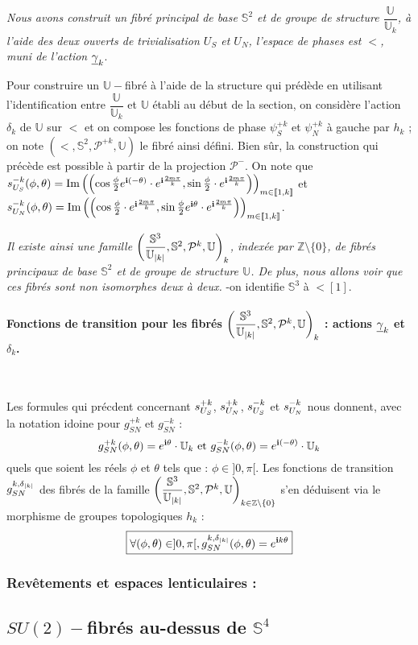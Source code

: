 \etoile
\emph{Nous avons construit un fibr\'e principal de base $\mathbb{S}^2$ et de groupe de structure $\dfrac{\mathbb{U}}{\mathbb{U}_k}$, %
\`a l'aide des deux ouverts de trivialisation $U_S$ et $U_N$, l'espace de phases est $\lt$, muni de l'action $\gk$}.
\par
Pour construire un $\mathbb{U}-$fibr\'e \`a l'aide de la structure qui pr\'ed\`ede en utilisant l'identification entre $\dfrac{\mathbb{U}}{\mathbb{U}_k}$ et $\mathbb{U}$ \'etabli au d\'ebut de la section, %
on consid\`ere l'action $\delta_k$ de $\mathbb{U}$ sur $\lt$ et on compose les fonctions de phase $\psi_S^{+k}$ et $\psi_N^{+k}$ \`a gauche par $h_k$ ; %
on note $\left(\lt ,\mathbb{S}^2,\mathcal{P}^{+k},\mathbb{U}\right)$ le fibr\'e ainsi d\'efini.
\ligneinter
Bien s\^ur, la construction qui pr\'ec\`ede est possible \`a partir de la projection $\mathcal{P}^-$. %
On note que $\se{S}{-k}(\phi,\theta)=\pla{\cos\frac{\phi}{2}\ec{(-\theta)}}{\sin\frac{\phi}{2}}$ et $\se{N}{-k}(\phi,\theta)=\pla{\cos\frac{\phi}{2}}{\sin\frac{\phi}{2}\ec{\theta}}$.
\par
\emph{Il existe ainsi une famille $\left(\lt[\abs{k}],\mathbb{S}^2,\mathcal{P}^k,\mathbb{U}\right)_k$, index\'ee par $\mathbb{Z}\setminus\{0\}$, de fibr\'es principaux de base $\mathbb{S}^2$ et de groupe de structure $\mathbb{U}$. %
De plus, nous allons voir que ces fibr\'es sont \emph{non isomorphes} deux \`a deux.} -on identifie $\mathbb{S}^3$ \`a $\lt[1]$.

\paragraph{Fonctions de transition pour les fibr\'es $\left(\lt[\abs{k}],\mathbb{S}^2,\mathcal{P}^k,\mathbb{U}\right)_k$ : actions $\gk$ et $\delta_k$.}~\\
\par
Les formules qui pr\'ecdent concernant $\se{S}{+k}$, $\se{N}{+k}$, $\se{S}{-k}$ et $\se{N}{-k}$ nous donnent, avec la notation idoine pour $g_{SN}^{+k}$ et $g_{SN}^{-k}$ :
\[g_{SN}^{+k}(\phi ,\theta)=\ec{\theta}\cdot\mathbb{U}_k\text{ et }g_{SN}^{-k}(\phi ,\theta)=\ec{(-\theta)}\cdot\mathbb{U}_k\]
quels que soient les r\'eels $\phi$ et $\theta$ tels que : $\phi\in ]0,\pi[$.
\ligneinter
Les fonctions de transition $g_{SN}^{k,\delta_{\abs{k}}}$ des fibr\'es de la famille $\left(\lt[\abs{k}],\mathbb{S}^2,\mathcal{P}^k,\mathbb{U}\right)_{k\in\mathbb{Z}\setminus\{0\}}$ %
s'en d\'eduisent via le morphisme de groupes topologiques $h_k$ :
\[\boxed{\forall (\phi,\theta)\in ]0,\pi [,g_{SN}^{k,\delta_{\abs{k}}}(\phi,\theta)=\ec{k\theta}}\]

\subsubsection{Rev\^etements et espaces lenticulaires :}

\subsection{$SU(2)-$fibr\'es au-dessus de $\mathbb{S}^4$}

